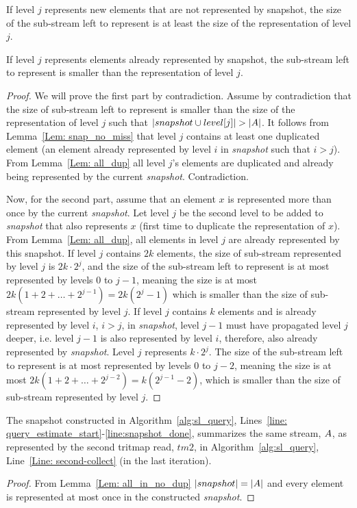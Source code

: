 \begin{lemma}\label{Lem: all_in_no_dup}
If level $j$ represents new elements that are not represented by snapshot, the size of the sub-stream left to represent is at least the size of the representation of level $j$.

If level $j$ represents elements already represented by snapshot, the sub-stream left to represent is smaller than the representation of level $j$.
\end{lemma}
\begin{proof}
We will prove the first part by contradiction. Assume by contradiction that the size of sub-stream left to represent is smaller than the size of the representation of level $j$ such that $|snapshot\cup level[j]| > |\mathnormal{A}|$. It follows from Lemma~\ref{Lem: snap_no_miss} that level $j$ contains at least one duplicated element (an element already represented by level $i$ in \emph{snapshot} such that $i>j$). From Lemma~\ref{Lem: all_dup} all level $j$'s elements are duplicated and already being represented by the current \emph{snapshot}. Contradiction. 

Now, for the second part, assume that an element $x$ is represented more than once by the current \emph{snapshot}. Let level $j$ be the second level to be added to \emph{snapshot} that also represents $x$ (first time to duplicate the representation of $x$). From Lemma~\ref{Lem: all_dup}, all elements in level $j$ are already represented by this snapshot.
If level $j$ contains $2k$ elements, the size of sub-stream represented by level $j$ is $2k\cdot2^j$, and the size of the sub-stream left to represent is at most represented by levels 0 to $j-1$, meaning the size is at most $2k(1+2+\dots+2^{j-1})=2k(2^j-1)$ which is smaller than the size of sub-stream represented by level $j$.
If level $j$ contains $k$ elements and is already represented by level $i$, $i>j$, in \emph{snapshot}, level $j-1$ must have propagated level $j$ deeper, i.e. level $j-1$ is also represented by level $i$, therefore, also already represented by \emph{snapshot}. Level $j$ represents $k\cdot2^j$. The size of the sub-stream left to represent is at most represented by levels 0 to $j-2$, meaning the size is at most $2k(1+2+\dots+2^{j-2})=k(2^{j-1}-2)$, which is smaller than the size of sub-stream represented by level $j$.
\end{proof}


\begin{lemma} \label{Lem: query_estimate}
The snapshot constructed in Algorithm~\ref{alg:sl_query}, Lines~\ref{line: query_estimate_start}-\ref{line:snapshot_done}, summarizes the same stream, $\mathnormal{A}$, as represented by the second tritmap read, $tm2$, in Algorithm~\ref{alg:sl_query}, Line~\ref{Line: second-collect} (in the last iteration).
\end{lemma}
\begin{proof}
From Lemma~\ref{Lem: all_in_no_dup} $|snapshot|=|\mathnormal{A}|$ and every element is represented at most once in the constructed \emph{snapshot}.
\end{proof}
